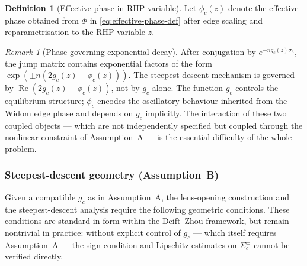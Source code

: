 \documentclass[12pt,a4paper]{amsart}
\theoremstyle{definition}
\newtheorem{definition}[theorem]{Definition}
\theoremstyle{remark}
\newtheorem{remark}[theorem]{Remark}
\begin{document}
\begin{definition}[Effective phase in RHP variable]
\label{def:effective-phase-rhp}
Let $\phi_c(z)$ denote the effective phase obtained from
$\Phi$ in \eqref{eq:effective-phase-def} after edge scaling and
reparametrisation to the RHP variable $z$.
\end{definition}

\begin{remark}[Phase governing exponential decay]
\label{rem:phase-governs}
After conjugation by $e^{-n g_c(z)\sigma_3}$, the jump matrix
contains exponential factors of the form
$\exp(\pm n(2g_c(z) - \phi_c(z)))$.
The steepest-descent mechanism is governed by
$\operatorname{Re}(2g_c(z) - \phi_c(z))$, not by $g_c$ alone.
The function $g_c$ controls the equilibrium structure;
$\phi_c$ encodes the oscillatory behaviour inherited from the
Widom edge phase and depends on $g_c$ implicitly.
The interaction of these two coupled objects --- which are not
independently specified but coupled through the nonlinear constraint
of Assumption~A --- is the essential difficulty of the whole problem.
\end{remark}

\subsubsection{Steepest-descent geometry (Assumption~B)}

Given a compatible $g_c$ as in Assumption~A, the lens-opening
construction and the steepest-descent analysis require the following
geometric conditions. These conditions are standard in form within
the Deift--Zhou framework, but remain nontrivial in practice:
without explicit control of $g_c$ --- which itself requires
Assumption~A --- the sign condition and Lipschitz estimates on
$\Sigma_c^\pm$ cannot be verified directly.
\end{document}

